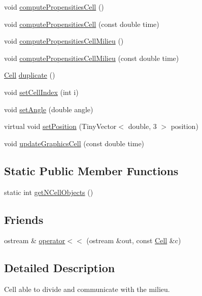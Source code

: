 \begin{DoxyCompactItemize}
\item 
void \hyperlink{class_cell_ada072ae0aa05f43fda6daa196c8342d3}{compute\-Propensities\-Cell} ()
\item 
void \hyperlink{class_cell_a3502b355df87e09a247e4387b6dd4217}{compute\-Propensities\-Cell} (const double time)
\item 
void \hyperlink{class_cell_a8c5abd4f4386f83a8d3fc02ece00a5ef}{compute\-Propensities\-Cell\-Milieu} ()
\item 
void \hyperlink{class_cell_a0fe39496c6ca627b2930ce5923b3cb1c}{compute\-Propensities\-Cell\-Milieu} (const double time)
\item 
\hyperlink{class_cell}{\-Cell} \hyperlink{class_cell_a23acbe45a58bbed665c46528ec0717cd}{duplicate} ()
\item 
void \hyperlink{class_cell_a8fa3d31ea4774884a1dd0ce488f14123}{set\-Cell\-Index} (int i)
\item 
void \hyperlink{class_cell_a91d52e997836d430d05e5c810f553ce9}{set\-Angle} (double angle)
\item 
virtual void \hyperlink{class_cell_a7546388567cca19b27af68236161e91b}{set\-Position} (\-Tiny\-Vector$<$ double, 3 $>$ position)
\item 
void \hyperlink{class_cell_afea44081620717505850e33262a70472}{update\-Graphics\-Cell} (const double time)
\end{DoxyCompactItemize}
\subsection*{\-Static \-Public \-Member \-Functions}
\begin{DoxyCompactItemize}
\item 
static int \hyperlink{class_cell_ae2dfe08ecb85bc573d847bc992380e4a}{get\-N\-Cell\-Objects} ()
\end{DoxyCompactItemize}
\subsection*{\-Friends}
\begin{DoxyCompactItemize}
\item 
ostream \& \hyperlink{class_cell_ab7519ad9f97e822bc4c886ea1e85c29f}{operator$<$$<$} (ostream \&out, const \hyperlink{class_cell}{\-Cell} \&c)
\end{DoxyCompactItemize}


\subsection{\-Detailed \-Description}
\-Cell able to divide and communicate with the milieu.

